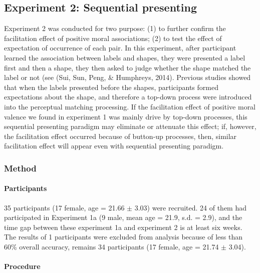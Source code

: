 \documentclass[
  english,
  man]{apa6}
\let\oldparagraph\paragraph
\renewcommand{\paragraph}[1]{\oldparagraph{#1}\mbox{}}
\begin{document}
\hypertarget{experiment-2-sequential-presenting}{%
\subsection{Experiment 2: Sequential presenting}\label{experiment-2-sequential-presenting}}

Experiment 2 was conducted for two purpose: (1) to further confirm the facilitation effect of positive moral associations; (2) to test the effect of expectation of occurrence of each pair. In this experiment, after participant learned the association between labels and shapes, they were presented a label first and then a shape, they then asked to judge whether the shape matched the label or not (see (Sui, Sun, Peng, \& Humphreys, 2014). Previous studies showed that when the labels presented before the shapes, participants formed expectations about the shape, and therefore a top-down process were introduced into the perceptual matching processing. If the facilitation effect of positive moral valence we found in experiment 1 was mainly drive by top-down processes, this sequential presenting paradigm may eliminate or attenuate this effect; if, however, the facilitation effect occurred because of button-up processes, then, similar facilitation effect will appear even with sequential presenting paradigm.

\hypertarget{method-2}{%
\subsubsection{Method}\label{method-2}}

\hypertarget{participants-3}{%
\paragraph{Participants}\label{participants-3}}

35 participants (17 female, age = 21.66 \(\pm\) 3.03) were recruited. 24 of them had participated in Experiment 1a (9 male, mean age = 21.9, s.d. = 2.9), and the time gap between these experiment 1a and experiment 2 is at least six weeks. The results of 1 participants were excluded from analysis because of less than 60\% overall accuracy, remains 34 participants (17 female, age = 21.74 \(\pm\) 3.04).

\hypertarget{procedure-3}{%
\paragraph{Procedure}\label{procedure-3}}
\end{document}

